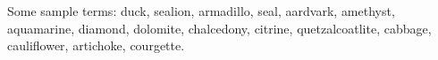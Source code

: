 \documentclass[12pt,a4paper]{article}
\newcommand{\nestedhandler}[1]{%
  \glsxtrunsrtdo{#1}%
  \ifglossaryexists*{#1}%
  {%
    \printunsrtinnerglossary[type={#1},leveloffset=++1,groups=false]{}{}%
  }%
  {}%
}
\begin{document}
Some sample terms: \gls{duck}, \gls{sealion}, \gls{armadillo},
\gls{seal}, \gls{aardvark}, \gls{amethyst}, \gls{aquamarine},
\gls{diamond}, \gls{dolomite}, \gls{chalcedony}, \gls{citrine},
\gls{quetzalcoatlite}, \gls{cabbage}, \gls{cauliflower},
\gls{artichoke}, \gls{courgette}.


\printunsrtglossary*{%
  \let\printunsrtglossaryhandler\nestedhandler
}
\end{document}
